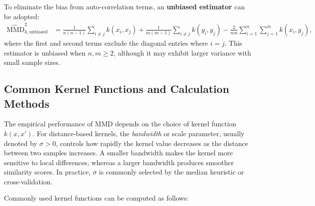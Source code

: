 \documentclass{article}
\theoremstyle{plain}
\theoremstyle{definition}
\theoremstyle{remark}
\begin{document}
To eliminate the bias from auto-correlation terms, an \textbf{unbiased estimator} can be adopted:
\begin{align}
    \widehat{\mathrm{MMD}}_{k,\text{unbiased}}^2
    &= \frac{1}{n(n-1)} \sum_{i \neq j} k(x_i, x_j)
    + \frac{1}{m(m-1)} \sum_{i \neq j} k(y_i, y_j)
    - \frac{2}{nm} \sum_{i=1}^n \sum_{j=1}^m k(x_i, y_j),
\end{align}
where the first and second terms exclude the diagonal entries where $i=j$. This estimator is unbiased when $n, m \geq 2$, although it may exhibit larger variance with small sample sizes.
\subsection{Common Kernel Functions and Calculation Methods}

The empirical performance of MMD depends on the choice of kernel function $k(x,x')$. For distance-based kernels, the \emph{bandwidth} or scale parameter, usually denoted by $\sigma>0$, controls how rapidly the kernel value decreases as the distance between two samples increases. A smaller bandwidth makes the kernel more sensitive to local differences, whereas a larger bandwidth produces smoother similarity scores. In practice, $\sigma$ is commonly selected by the median heuristic or cross-validation.

Commonly used kernel functions can be computed as follows:
\end{document}
